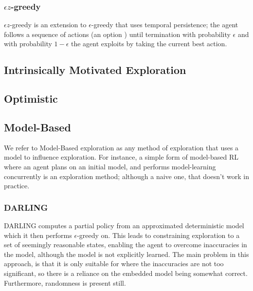 \subsubsection{$\epsilon z$-greedy}
$\epsilon z$-greedy \cite{dabney2021temporallyextended} is an extension to $\epsilon$-greedy that uses temporal persistence; the agent follows a sequence of actions (an option \cite{SUTTON1999181}) until termination with probability $\epsilon$ and with probability $1-\epsilon$ the agent exploits by taking the current best action.
\subsection{Intrinsically Motivated Exploration}
\cite{scott1996, pmlr-v97-jinnai19b, Jinnai2020Exploration}
\subsection{Optimistic}
\cite{10.1145/1390156.1390288, NIPS2006_c1b70d96, 10.1162/153244303765208377, NIPS2008_d5cfead9}
\subsection{Model-Based}
We refer to Model-Based exploration as any method of exploration that uses a model to influence exploration. For instance, a simple form of model-based RL where an agent plans on an initial model, and performs model-learning concurrently is an exploration method; although a naive one, that doesn't work in practice.\\
\cite{SARA07-jong, Littman2011EfficientME, Epshteyn2008ActiveRL}
\subsubsection{DARLING}
DARLING \cite{AIJ16-leonetti} computes a partial policy from an approximated deterministic model which it then performs $\epsilon$-greedy on. This leads to constraining exploration to a set of seemingly reasonable states, enabling the agent to overcome inaccuracies in the model, although the model is not explicitly learned. The main problem in this approach, is that it is only suitable for where the inaccuracies are not too significant, so there is a reliance on the embedded model being somewhat correct. Furthermore, randomness is present still.
